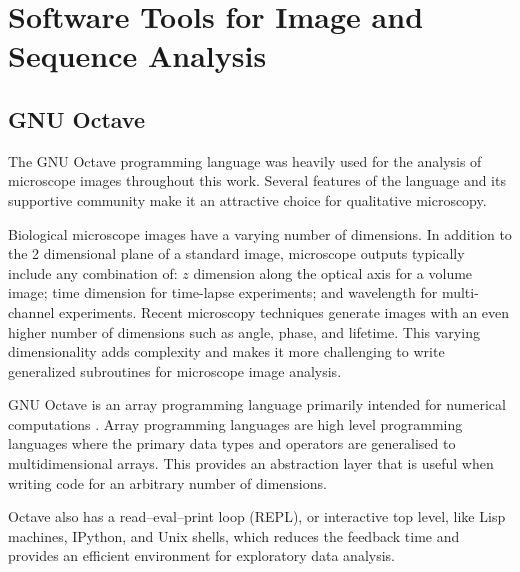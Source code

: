 \chapter{Software Tools for Image and Sequence Analysis}


\section{GNU Octave}

The GNU Octave programming language was heavily used for the analysis
of microscope images throughout this work.  Several features of the
language and its supportive community make it an attractive choice
for qualitative microscopy.


Biological microscope images have a varying number of dimensions.
In addition to the 2 dimensional plane of a standard image, microscope
outputs typically include any combination of: $z$ dimension along
the optical axis for a volume image; time dimension for time-lapse
experiments; and wavelength for multi-channel experiments.  Recent microscopy
techniques generate images with an even higher number of dimensions
such as angle, phase, and lifetime.  This varying dimensionality adds
complexity and makes it more challenging to write generalized subroutines for
microscope image analysis.

GNU Octave is an array programming language primarily intended for
numerical computations \citep{octave}.  Array programming languages
are high level programming languages where the primary data types and
operators 
are generalised to multidimensional arrays.  This provides
an abstraction layer that is useful when writing code for an arbitrary
number of dimensions.

Octave also has a read–eval–print loop (REPL), or interactive top
level, like Lisp machines, IPython, and Unix shells, which reduces the
feedback time and provides an efficient
environment for exploratory data analysis.


